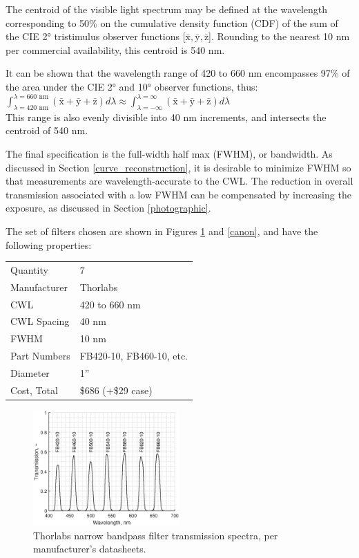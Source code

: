 \documentclass[twocolumn,10pt]{asme2ej}
\newcommand{\id}{\hspace{6 mm}}
\begin{document}
\id The centroid of the visible light spectrum may be defined at the wavelength corresponding to 50\% on the cumulative density function (CDF) of the sum of the CIE 2° tristimulus observer functions [$\mathrm{\bar{x}}, \mathrm{\bar{y}}, \mathrm{\bar{z}}$]. \cite{CVRL} Rounding to the nearest 10 nm per commercial availability, this centroid is 540 nm.

\id It can be shown that the wavelength range of 420 to 660 nm encompasses 97\% of the area under the CIE 2° and 10° observer functions, thus: \cite{CVRL}\\

$ \displaystyle \int_{\lambda = \textrm{420 nm}}^{\lambda = \textrm{660 nm}} ( \mathrm{\bar{x}}+\mathrm{\bar{y}}+\mathrm{\bar{z}} ) d\lambda \approx \int_{\lambda = -\infty}^{\lambda = \infty} ( \mathrm{\bar{x}}+\mathrm{\bar{y}}+\mathrm{\bar{z}} ) d\lambda $ \\

This range is also evenly divisible into 40 nm increments, and intersects the centroid of 540 nm.

\id The final specification is the full-width half max (FWHM), or bandwidth. As discussed in Section \ref{curve_reconstruction}, it is desirable to minimize FWHM so that measurements are wavelength-accurate to the CWL. The reduction in overall transmission associated with a low FWHM can be compensated by increasing the exposure, as discussed in Section \ref{photographic}.

\id The set of filters chosen are shown in Figures \ref{thorlabs_filter_transmission_spectra} and \ref{canon}, and have the following properties:\\

\begin{tabular}{l | l}
Quantity & 7 \\
Manufacturer & Thorlabs \\
CWL & 420 to 660 nm \\
CWL Spacing & 40 nm \\
FWHM & 10 nm \\
Part Numbers & FB420-10, FB460-10, etc. \\
Diameter & 1'' \\
Cost, Total & \$686 (+\$29 case) \\
\end{tabular}

\begin{figure}
\centering
\includegraphics[width=0.5\textwidth]{thorlabs_filter_transmission_spectra.eps}
\caption{Thorlabs narrow bandpass filter transmission spectra, per manufacturer's datasheets. \cite{Thorlabs}}
\label{thorlabs_filter_transmission_spectra}
\end{figure}
\end{document}

